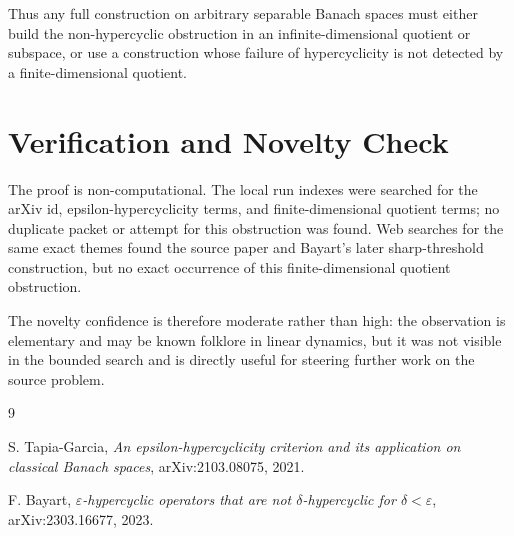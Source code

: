 \documentclass[11pt]{article}
\newcommand{\eps}{\varepsilon}
\begin{document}
Thus any full construction on arbitrary separable Banach spaces must either
build the non-hypercyclic obstruction in an infinite-dimensional quotient or
subspace, or use a construction whose failure of hypercyclicity is not detected
by a finite-dimensional quotient.

\section*{Verification and Novelty Check}

The proof is non-computational.  The local run indexes were searched for the
arXiv id, epsilon-hypercyclicity terms, and finite-dimensional quotient terms;
no duplicate packet or attempt for this obstruction was found.  Web searches
for the same exact themes found the source paper and Bayart's later
sharp-threshold construction, but no exact occurrence of this
finite-dimensional quotient obstruction.

The novelty confidence is therefore moderate rather than high: the observation
is elementary and may be known folklore in linear dynamics, but it was not
visible in the bounded search and is directly useful for steering further work
on the source problem.

\begin{thebibliography}{9}

S. Tapia-Garcia,
\emph{An epsilon-hypercyclicity criterion and its application on classical
Banach spaces},
arXiv:2103.08075, 2021.

F. Bayart,
\emph{\(\eps\)-hypercyclic operators that are not \(\delta\)-hypercyclic for
\(\delta<\eps\)},
arXiv:2303.16677, 2023.

\end{thebibliography}
\end{document}
